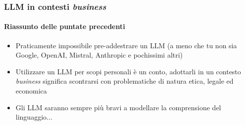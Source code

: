 \begin{frame}[t] \frametitle{LLM in contesti \emph{business}}
\framesubtitle{Riassunto delle puntate precedenti}
{\small
{}
    \begin{minipage}[t]{\textwidth}
        \begin{itemize}[leftmargin=10pt,align=right]
            \item[\alert{\faArrowCircleRight}] Praticamente impossibile pre-addestrare un LLM (a meno che tu non sia Google, OpenAI, Mistral, Anthropic e pochissimi altri)
            \item[\alert{\faArrowCircleRight}] Utilizzare un LLM per scopi personali è un conto, adottarli in un contesto \emph{business} significa scontrarsi con problematiche di natura etica, legale ed economica
            \item[\alert{\faArrowCircleRight}] Gli LLM saranno sempre più bravi a modellare la comprensione del linguaggio$\ldots$
        \end{itemize}
        \vspace*{.5cm}
    \end{minipage}
}
\end{frame}
%
